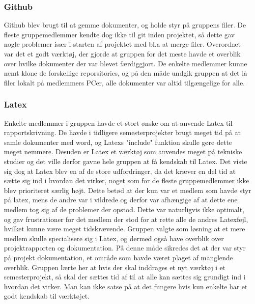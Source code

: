\subsubsection{Github}
Github blev brugt til at gemme dokumenter, og holde styr på gruppens filer. De fleste gruppemedlemmer kendte dog ikke til git inden projektet, 
så dette gav nogle problemer især i starten af projektet med bl.a at merge filer. Overordnet var det et godt værktøj, der gjorde at gruppen for det meste havde
et overblik over hvilke dokumenter der var blevet færdiggjort. De enkelte medlemmer kunne nemt klone de forskellige reporsitories, og på den måde undgik gruppen
at det lå filer lokalt på medlemmers PCer, alle dokumenter var altid tilgængelige for alle.  

\subsubsection{Latex}
Enkelte medlemmer i gruppen havde et stort ønske om at anvende Latex til rapportskrivning. De havde i tidligere semesterprojekter brugt meget tid på at
samle dokumenter med word, og Latexs "include" funktion skulle gøre dette meget nemmere. Desuden er Latex et værktøj som anvendes meget på tekniske studier
og det ville derfor gavne hele gruppen at få kendskab til Latex. Det viste sig dog at Latex blev en af de store udfordringer, da det kræver en del
tid at sætte sig ind i hvordan det virker, noget som for de fleste gruppemedlemmer ikke blev prioriteret særlig højt. Dette betød at der kun var et medlem som havde 
styr på latex, mens de andre var i vildrede og derfor var afhængige af at dette ene medlem tog sig af de problemer der opstod. Dette var naturligvis ikke 
optimalt, og gav frustrationer for det medlem der stod for at rette alle de andres Latexfejl, hvilket kunne være meget tidskrævende. Gruppen valgte som løsning 
at et mere medlem skulle specialisere sig i Latex, og dermed også have overblik over projektrapporten og dokumentation. På denne måde sikredes det at der var 
styr på projekt dokumentation, et område som havde været plaget af manglende overblik. Gruppen lærte her at hvis der skal inddrages et nyt værktøj i et 
semesterprojekt, så skal der sættes tid af til at alle kan sættes sig grundigt ind i hvordan det virker. Man kan ikke satse på at det fungere hvis kun enkelte 
har et godt kendskab til værktøjet. 

